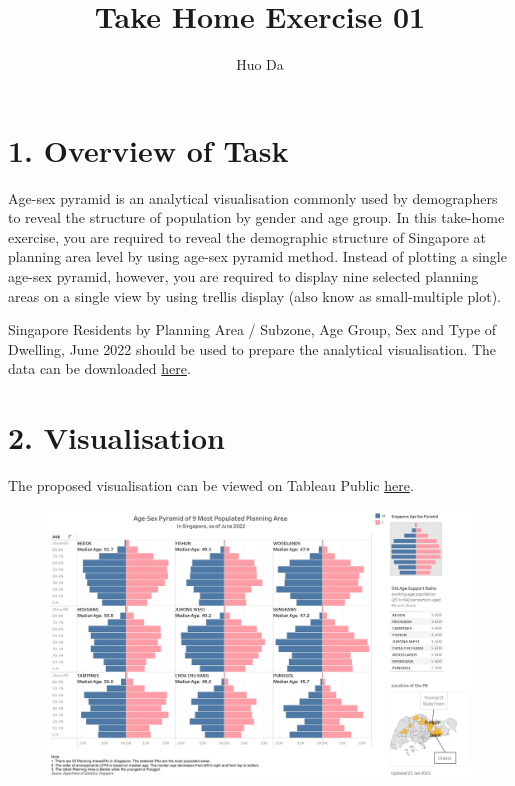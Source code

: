 \documentclass[
  letterpaper,
  DIV=11,
  numbers=noendperiod,
  oneside]{scrartcl}
\title{Take Home Exercise 01}
\author{Huo Da}
\date{}
\begin{document}
\maketitle
\ifdefined\Shaded\renewenvironment{Shaded}{\begin{tcolorbox}[boxrule=0pt, breakable, borderline west={3pt}{0pt}{shadecolor}, interior hidden, enhanced, sharp corners, frame hidden]}{\end{tcolorbox}}\fi

\hypertarget{overview-of-task}{%
\section{1. Overview of Task}\label{overview-of-task}}

Age-sex pyramid is an analytical visualisation commonly used by
demographers to reveal the structure of population by gender and age
group. In this take-home exercise, you are required to reveal the
demographic structure of Singapore at planning area level by using
age-sex pyramid method. Instead of plotting a single age-sex pyramid,
however, you are required to display nine selected planning areas on a
single view by using trellis display (also know as small-multiple plot).

Singapore Residents by Planning Area / Subzone, Age Group, Sex and Type
of Dwelling, June 2022 should be used to prepare the analytical
visualisation. The data can be downloaded
\href{https://www.singstat.gov.sg/find-data/search-by-theme/population/geographic-distribution/latest-data}{here}.

\hypertarget{visualisation}{%
\section{2. Visualisation}\label{visualisation}}

The proposed visualisation can be viewed on Tableau Public
\href{https://public.tableau.com/app/profile/huoda1027/viz/TakeHome_Ex01_16742612602400/Dashboard1?publish=yes}{here}.

\begin{figure}

{\centering \includegraphics{images/vis-02.jpg}

}

\end{figure}
\end{document}

